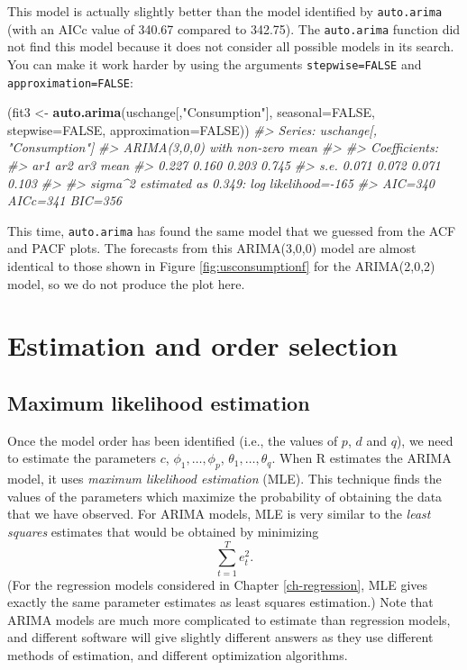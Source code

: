 \documentclass[]{book}
\newenvironment{Shaded}{\begin{snugshade}}{\end{snugshade}}
\newcommand{\CommentTok}[1]{\textcolor[rgb]{0.56,0.35,0.01}{\textit{#1}}}
\newcommand{\DataTypeTok}[1]{\textcolor[rgb]{0.13,0.29,0.53}{#1}}
\newcommand{\KeywordTok}[1]{\textcolor[rgb]{0.13,0.29,0.53}{\textbf{#1}}}
\newcommand{\NormalTok}[1]{#1}
\newcommand{\OtherTok}[1]{\textcolor[rgb]{0.56,0.35,0.01}{#1}}
\newcommand{\StringTok}[1]{\textcolor[rgb]{0.31,0.60,0.02}{#1}}
\begin{document}
This model is actually slightly better than the model identified by \texttt{auto.arima} (with an AICc value of 340.67 compared to 342.75). The \texttt{auto.arima} function did not find this model because it does not consider all possible models in its search. You can make it work harder by using the arguments \texttt{stepwise=FALSE} and \texttt{approximation=FALSE}:

\begin{Shaded}
\begin{Highlighting}[]
\NormalTok{(fit3 <-}\StringTok{ }\KeywordTok{auto.arima}\NormalTok{(uschange[,}\StringTok{"Consumption"}\NormalTok{], }\DataTypeTok{seasonal=}\OtherTok{FALSE}\NormalTok{,}
  \DataTypeTok{stepwise=}\OtherTok{FALSE}\NormalTok{, }\DataTypeTok{approximation=}\OtherTok{FALSE}\NormalTok{))}
\CommentTok{#> Series: uschange[, "Consumption"] }
\CommentTok{#> ARIMA(3,0,0) with non-zero mean }
\CommentTok{#> }
\CommentTok{#> Coefficients:}
\CommentTok{#>         ar1    ar2    ar3   mean}
\CommentTok{#>       0.227  0.160  0.203  0.745}
\CommentTok{#> s.e.  0.071  0.072  0.071  0.103}
\CommentTok{#> }
\CommentTok{#> sigma^2 estimated as 0.349:  log likelihood=-165}
\CommentTok{#> AIC=340   AICc=341   BIC=356}
\end{Highlighting}
\end{Shaded}

This time, \texttt{auto.arima} has found the same model that we guessed from the ACF and PACF plots. The forecasts from this ARIMA(3,0,0) model are almost identical to those shown in Figure \ref{fig:usconsumptionf} for the ARIMA(2,0,2) model, so we do not produce the plot here.

\hypertarget{estimation-and-order-selection}{%
\section{Estimation and order selection}\label{estimation-and-order-selection}}

\hypertarget{maximum-likelihood-estimation}{%
\subsection*{Maximum likelihood estimation}\label{maximum-likelihood-estimation}}

Once the model order has been identified (i.e., the values of \(p\), \(d\) and \(q\)), we need to estimate the parameters \(c\), \(\phi_1,\dots,\phi_p\), \(\theta_1,\dots,\theta_q\). When R estimates the ARIMA model, it uses \emph{maximum likelihood estimation} (MLE). This technique finds the values of the parameters which maximize the probability of obtaining the data that we have observed. For ARIMA models, MLE is very similar to the \emph{least squares} estimates that would be obtained by minimizing
\[
  \sum_{t=1}^Te_t^2.
\]
(For the regression models considered in Chapter \ref{ch-regression}, MLE gives exactly the same parameter estimates as least squares estimation.) Note that ARIMA models are much more complicated to estimate than regression models, and different software will give slightly different answers as they use different methods of estimation, and different optimization algorithms.
\end{document}
